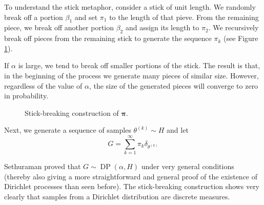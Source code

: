 \documentclass[final,3p,times,twocolumn]{elsarticle}
\DeclareMathOperator*{\DP}{DP}
\DeclareMathOperator*{\Beta}{Beta}
\let\bs\boldsymbol
\begin{document}
To understand the stick metaphor, consider a stick of unit length. 
We randomly break off a portion $\beta_1$ and set $\pi_1$ to the length of that pieve. 
From the remaining piece, we break off another portion $\beta_2$ and assign its length to $\pi_2$.
We recursively break off pieces from the remaining stick to generate the sequence $\pi_k$ (see Figure \ref{fig:stick}).

If $\alpha$ is large, we tend to break off smaller portions of the stick.
The result is that, in the beginning of the process we generate many pieces of similar size.
However, regardless of the value of $\alpha$, the size of the generated pieces will converge to zero in probability.

\begin{figure}
\caption{Stick-breaking construction of $\bs \pi$.}
\label{fig:stick}
\end{figure}

Next, we generate a sequence of samples $\theta^{(k)} \sim H$ and let
\begin{equation*}
G = \sum_{k=1}^\infty \pi_k \delta_{\theta^{(k)}}
\end{equation*}

Sethuraman \cite{sethuraman94} proved that $G \sim \DP(\alpha,H)$ under very general conditions (thereby also giving a more straightforward and general proof of the existence of Dirichlet processes than seen before).
The stick-breaking construction shows very clearly that samples from a Dirichlet distribution are discrete measures.
\end{document}
